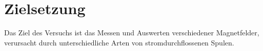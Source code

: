 \section{Zielsetzung}
\label{sec:Zielsetzung}
Das Ziel des Versuchs ist das Messen und Auswerten verschiedener Magnetfelder, verursacht
durch unterschiedliche Arten von stromdurchflossenen Spulen.

